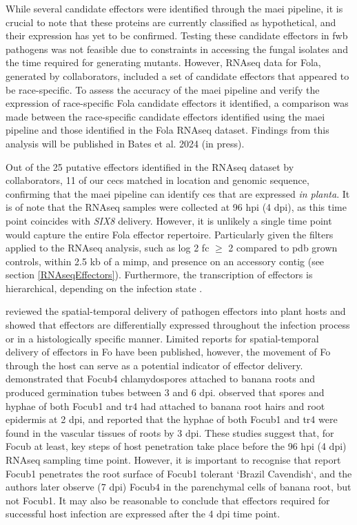 While several candidate effectors were identified through the \ac{maei} pipeline, it is crucial to note that these proteins are currently classified as hypothetical, and their expression has yet to be confirmed. Testing these candidate effectors in \ac{fwb} pathogens was not feasible due to constraints in accessing the fungal isolates and the time required for generating mutants. However, RNAseq data for \ac{Fola}, generated by collaborators, included a set of candidate effectors that appeared to be race-specific. To assess the accuracy of the \ac{maei} pipeline and verify the expression of race-specific \ac{Fola} candidate effectors it identified, a comparison was made between the race-specific candidate effectors identified using the \ac{maei} pipeline and those identified in the \ac{Fola} RNAseq dataset. Findings from this analysis will be published in Bates et al. 2024 (in press).
 
Out of the 25 putative effectors identified in the RNAseq dataset by collaborators, 11 of our \acp{cec} matched in location and genomic sequence, confirming that the \ac{maei} pipeline can identify \acp{ce} that are expressed \textit{in planta}. It is of note that the RNAseq samples were collected at 96 \ac{hpi} (4 \ac{dpi}), as this time point coincides with \textit{SIX8} delivery. However, it is unlikely a single time point would capture the entire \ac{Fola} effector repertoire. Particularly given the filters applied to the RNAseq analysis, such as log 2 \acf{fc} $\geq$ 2 compared to \ac{pdb} grown controls, within 2.5 kb of a \ac{mimp}, and presence on an accessory contig (see section \ref{RNAseqEffectors}). Furthermore, the transcription of effectors is hierarchical, depending on the infection state \parencite{Giraldo2013}. 

\textcite{Toruno2016} reviewed the spatial-temporal delivery of pathogen effectors into plant hosts and showed that effectors are differentially expressed throughout the infection process or in a histologically specific manner. Limited reports for spatial-temporal delivery of effectors in \ac{Fo} have been published, however, the movement of \ac{Fo} through the host can serve as a potential indicator of effector delivery. \textcite{Li2011} demonstrated that \ac{Focub4} chlamydospores attached to banana roots and produced germination tubes between 3 and 6 \ac{dpi}. \textcite{Li2017} observed that spores and hyphae of both \ac{Focub1} and \ac{tr4} had attached to banana root hairs and root epidermis at 2 \ac{dpi}, and reported that the hyphae of both \ac{Focub1} and \ac{tr4} were found in the vascular tissues of roots by 3 \ac{dpi}. These studies suggest that, for \ac{Focub} at least, key steps of host penetration take place before the 96 \ac{hpi} (4 \ac{dpi}) RNAseq sampling time point. However, it is important to recognise that \textcite{Li2017} report \ac{Focub1} penetrates the root surface of \ac{Focub1} tolerant `Brazil Cavendish`, and the authors later observe (7 \ac{dpi})  \ac{Focub4} in the parenchymal cells of banana root, but not \ac{Focub1}. It may also be reasonable to conclude that effectors required for successful host infection are expressed after the 4 \ac{dpi} time point.  


